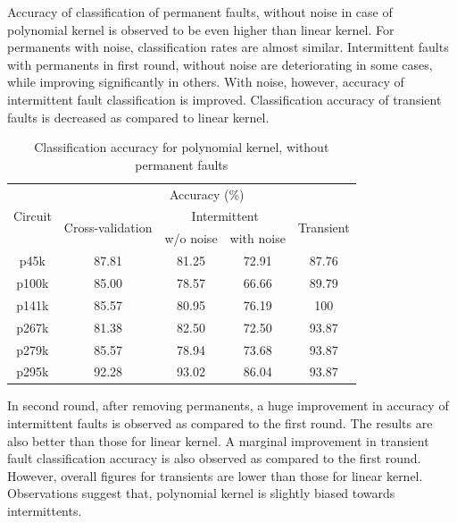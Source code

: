 Accuracy of classification of permanent faults, without noise in case of polynomial kernel is observed to be even higher than linear kernel. For permanents with noise, classification rates are almost similar. Intermittent faults with permanents in first round, without noise are deteriorating in some cases, while improving significantly in others. With noise, however, accuracy of intermittent fault classification is improved. Classification accuracy of transient faults is decreased as compared to linear kernel.

\begin{table}[h]

	\captionsetup{justification=centering}
\begin{tabular}{ccccc}
\hline
\multirow{3}{*}{Circuit} & \multicolumn{4}{c}{Accuracy (\%)}\\ \cline{2-5} 
                         & \multirow{2}{*}{Cross-validation} & \multicolumn{2}{c}{Intermittent} & \multirow{2}{*}{Transient} \\ \cline{3-4}
                         &                                   & w/o noise      & with noise      &                            \\ \hline
p45k                     & 87.81                             & 81.25          & 72.91           & 87.76                      \\
p100k                    & 85.00                             & 78.57          & 66.66           & 89.79                      \\
p141k                    & 85.57                             & 80.95          & 76.19           & 100                        \\
p267k                    & 81.38                             & 82.50          & 72.50           & 93.87                      \\
p279k                    & 85.57                             & 78.94          & 73.68           & 93.87                      \\
p295k                    & 92.28                             & 93.02          & 86.04           & 93.87                      \\
\hline
\end{tabular}
\caption {Classification accuracy for polynomial kernel, without permanent faults}
\label{tab:polywop}
\end{table}

In second round, after removing permanents, a huge improvement in accuracy of intermittent faults is observed as compared to the first round. The results are also better than those for linear kernel.  A marginal improvement in transient fault classification accuracy is also observed as compared to the first round. However, overall figures for transients are lower than those for linear kernel. Observations suggest that, polynomial kernel is slightly biased towards intermittents.


